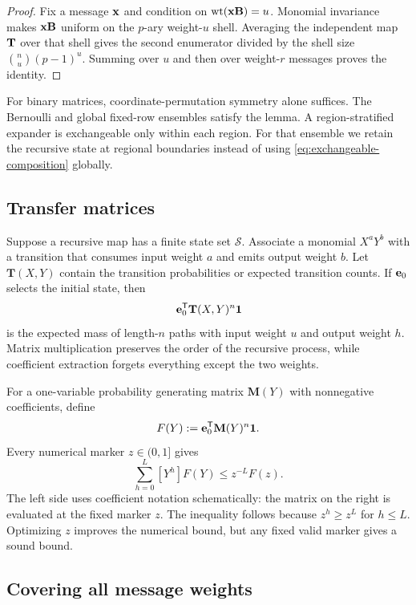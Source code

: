 \begin{proof}
Fix a message $\mathbf x$ and condition on $\operatorname{wt}(\mathbf x\mathbf B)=u$.  Monomial invariance makes
$\mathbf x\mathbf B$ uniform on the $p$-ary weight-$u$ shell.  Averaging the independent
map $\mathbf T$ over that shell
gives the second enumerator divided by the shell size
$\binom{n}{u}(p-1)^u$.  Summing over $u$ and then over weight-$r$ messages
proves the identity.
\end{proof}

For binary matrices, coordinate-permutation symmetry alone suffices.  The
Bernoulli and global fixed-row ensembles satisfy the lemma.  A
region-stratified expander is exchangeable only within each region.  For that
ensemble we retain the recursive state at regional boundaries instead of
using \eqref{eq:exchangeable-composition} globally.

\subsection{Transfer matrices}

Suppose a recursive map has a finite state set $\mathcal S$.  Associate a
monomial $X^aY^b$ with a transition that consumes input weight $a$ and emits
output weight $b$.  Let $\mathbf T(X,Y)$ contain the transition probabilities
or expected transition counts.  If $\mathbf e_0$ selects the initial state, then
\begin{equation}
 [X^uY^h]\,\e_0^{\mathsf T}\mathbf T(X,Y)^n\one
 \label{eq:transfer-coefficient}
\end{equation}
is the expected mass of length-$n$ paths with input weight $u$ and output
weight $h$.  Matrix multiplication preserves the order of the recursive
process, while coefficient extraction forgets everything except the two
weights.

For a one-variable probability generating matrix $\mathbf M(Y)$ with
nonnegative coefficients, define
\[
 F(Y):=\mathbf e_0^{\mathsf T}\mathbf M(Y)^n\mathbf 1.
\]
Every numerical marker $z\in(0,1]$ gives
\begin{equation}
 \sum_{h=0}^{L}[Y^h]F(Y)
 \leq z^{-L}F(z).
 \label{eq:positive-marker-tail}
\end{equation}
The left side uses coefficient notation schematically: the matrix on the
right is evaluated at the fixed marker $z$.  The inequality follows because
$z^h\geq z^L$ for $h\leq L$.  Optimizing $z$ improves the numerical bound,
but any fixed valid marker gives a sound bound.

\subsection{Covering all message weights}

